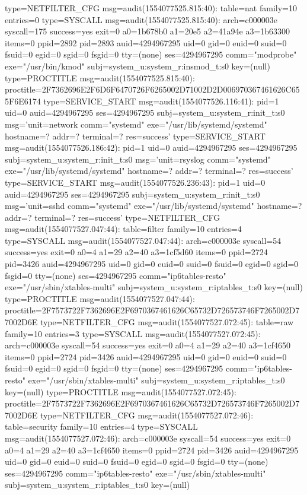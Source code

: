 \documentclass[]{report}
\newenvironment{Shaded}{}{}
\newcommand{\NormalTok}[1]{#1}
\begin{document}
\begin{Shaded}
\begin{Highlighting}[]
\NormalTok{type=NETFILTER_CFG msg=audit(1554077525.815:40): table=nat family=10 entries=0}
\NormalTok{type=SYSCALL msg=audit(1554077525.815:40): arch=c000003e syscall=175 success=yes exit=0 a0=1b678b0 a1=20e5 a2=41a94e a3=1b63300 items=0 ppid=2892 pid=2893 auid=4294967295 uid=0 gid=0 euid=0 suid=0 fsuid=0 egid=0 sgid=0 fsgid=0 tty=(none) ses=4294967295 comm="modprobe" exe="/usr/bin/kmod" subj=system_u:system_r:insmod_t:s0 key=(null)}
\NormalTok{type=PROCTITLE msg=audit(1554077525.815:40): proctitle=2F7362696E2F6D6F6470726F6265002D71002D2D006970367461626C655F6E6174}
\NormalTok{type=SERVICE_START msg=audit(1554077526.116:41): pid=1 uid=0 auid=4294967295 ses=4294967295 subj=system_u:system_r:init_t:s0 msg='unit=network comm="systemd" exe="/usr/lib/systemd/systemd" hostname=? addr=? terminal=? res=success'}
\NormalTok{type=SERVICE_START msg=audit(1554077526.186:42): pid=1 uid=0 auid=4294967295 ses=4294967295 subj=system_u:system_r:init_t:s0 msg='unit=rsyslog comm="systemd" exe="/usr/lib/systemd/systemd" hostname=? addr=? terminal=? res=success'}
\NormalTok{type=SERVICE_START msg=audit(1554077526.236:43): pid=1 uid=0 auid=4294967295 ses=4294967295 subj=system_u:system_r:init_t:s0 msg='unit=sshd comm="systemd" exe="/usr/lib/systemd/systemd" hostname=? addr=? terminal=? res=success'}
\NormalTok{type=NETFILTER_CFG msg=audit(1554077527.047:44): table=filter family=10 entries=4}
\NormalTok{type=SYSCALL msg=audit(1554077527.047:44): arch=c000003e syscall=54 success=yes exit=0 a0=4 a1=29 a2=40 a3=1cf5d60 items=0 ppid=2724 pid=3426 auid=4294967295 uid=0 gid=0 euid=0 suid=0 fsuid=0 egid=0 sgid=0 fsgid=0 tty=(none) ses=4294967295 comm="ip6tables-resto" exe="/usr/sbin/xtables-multi" subj=system_u:system_r:iptables_t:s0 key=(null)}
\NormalTok{type=PROCTITLE msg=audit(1554077527.047:44): proctitle=2F7573722F7362696E2F6970367461626C65732D726573746F7265002D77002D6E}
\NormalTok{type=NETFILTER_CFG msg=audit(1554077527.072:45): table=raw family=10 entries=3}
\NormalTok{type=SYSCALL msg=audit(1554077527.072:45): arch=c000003e syscall=54 success=yes exit=0 a0=4 a1=29 a2=40 a3=1cf4650 items=0 ppid=2724 pid=3426 auid=4294967295 uid=0 gid=0 euid=0 suid=0 fsuid=0 egid=0 sgid=0 fsgid=0 tty=(none) ses=4294967295 comm="ip6tables-resto" exe="/usr/sbin/xtables-multi" subj=system_u:system_r:iptables_t:s0 key=(null)}
\NormalTok{type=PROCTITLE msg=audit(1554077527.072:45): proctitle=2F7573722F7362696E2F6970367461626C65732D726573746F7265002D77002D6E}
\NormalTok{type=NETFILTER_CFG msg=audit(1554077527.072:46): table=security family=10 entries=4}
\NormalTok{type=SYSCALL msg=audit(1554077527.072:46): arch=c000003e syscall=54 success=yes exit=0 a0=4 a1=29 a2=40 a3=1cf4650 items=0 ppid=2724 pid=3426 auid=4294967295 uid=0 gid=0 euid=0 suid=0 fsuid=0 egid=0 sgid=0 fsgid=0 tty=(none) ses=4294967295 comm="ip6tables-resto" exe="/usr/sbin/xtables-multi" subj=system_u:system_r:iptables_t:s0 key=(null)}

\end{Highlighting}
\end{Shaded}
\end{document}
